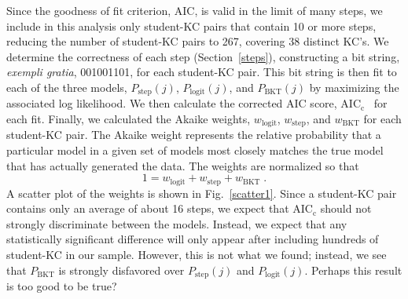 \documentclass[prodmode,acmtecs]{acmsmall}
\begin{document}
Since the goodness of fit criterion, AIC, is valid in the limit 
of many steps, we include in this analysis only student-KC 
pairs that contain 10 or more steps, reducing the number of 
student-KC pairs to 267, covering 38 distinct KC's.
We determine the correctness of each step (Section~\ref{steps}),
constructing a bit string, {\em exempli gratia},
001001101, for each student-KC pair.  
This bit string is then fit to each of the three models,
$P_\mathrm{step}(j)$, $P_\mathrm{logit}(j)$, and $P_\mathrm{BKT}(j)$ by
maximizing the associated log likelihood.  
We then calculate the corrected AIC score, AIC$_\mathrm{c}$~\cite{aicbook} 
for each fit.  
Finally, we calculated the Akaike weights, $w_\mathrm{logit}$,
$w_\mathrm{step}$, and $w_\mathrm{BKT}$ for each student-KC pair.  
The Akaike weight represents the relative probability that
a particular model in a given set of models most closely matches
the true model that has actually generated the data.
The weights are normalized so that 
%
\begin{equation}
   1=w_\mathrm{logit}+ w_\mathrm{step} + w_\mathrm{BKT} \; .
\end{equation}
%
A scatter plot of the weights is shown in Fig.~\ref{scatter1}.
Since a student-KC pair contains only an average of about 16 steps, we 
expect that AIC$_\mathrm{c}$ should not strongly
discriminate between the models.  Instead, we expect that
any statistically significant difference will only appear 
after including hundreds of student-KC in our sample.  However, 
this is not what we found; instead, we see that $P_\mathrm{BKT}$ is 
strongly disfavored over $P_\mathrm{step}(j)$ and $P_\mathrm{logit}(j)$.
Perhaps this result is too good to be true?
\end{document}
